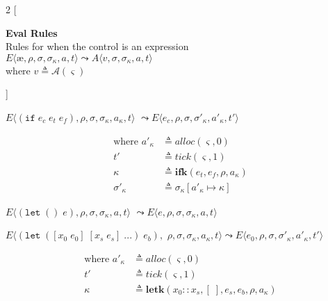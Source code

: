 \documentclass[12pt,draft]{article}
\newcommand\mae{\ensuremath{\text{\ae}}}
\newcommand{\ifsyn}[3]{(\texttt{if}\;#1\;#2\;#3)}
\begin{document}
\begin{multicols*}{2}
[
\begin{center}
\textbf{Eval Rules} \\
Rules for when the control is an expression \\
\vspace{10mm}
$E\langle \mae , \rho , \sigma , \sigma_\kappa , a , t \rangle
\leadsto
A\langle v , \sigma , \sigma_\kappa , a , t \rangle$ \\
where $v \triangleq \mathcal{A}(\varsigma)$
\end{center}
]
\begin{center}
  $E\langle \ifsyn{e_c}{e_t}{e_f} , \rho , \sigma , \sigma_\kappa , a_\kappa , t \rangle$
  $\leadsto E\langle e_c , \rho , \sigma , \sigma'_\kappa , a'_\kappa , t' \rangle$
\end{center}
\vspace{-5mm}
\begin{align*}
  \text{where }
  a'_\kappa &\triangleq alloc(\varsigma, 0) \\
  t' &\triangleq tick(\varsigma, 1) \\
  \kappa &\triangleq \textbf{ifk}(e_t, e_f, \rho, a_\kappa) \\
  \sigma'_\kappa &\triangleq \sigma_\kappa[a'_\kappa \mapsto \kappa]
\end{align*}
\begin{center}
  $E\langle (\texttt{let}\;()\;e) , \rho , \sigma , \sigma_\kappa , a , t \rangle$
  $\leadsto E\langle e , \rho , \sigma , \sigma_\kappa , a , t \rangle$
\end{center}
\begin{center}
  $E\langle
  (\texttt{let}\;([x_0\;e_0]\;[x_s\;e_s]\;...)\;e_b),$
  $\rho , \sigma , \sigma_\kappa , a_\kappa , t \rangle
   \leadsto E\langle e_0 , \rho , \sigma , \sigma'_\kappa , a'_\kappa , t' \rangle$
\end{center}
\vspace{-5mm}
\begin{align*}
  \text{where } a'_\kappa &\triangleq alloc(\varsigma, 0) \\
  t' &\triangleq tick(\varsigma, 1) \\
  \kappa &\triangleq \textbf{letk}(x_0::x_s, [\;], e_s, e_b, \rho, a_\kappa) \\

\end{align*}
\end{multicols*}
\end{document}
